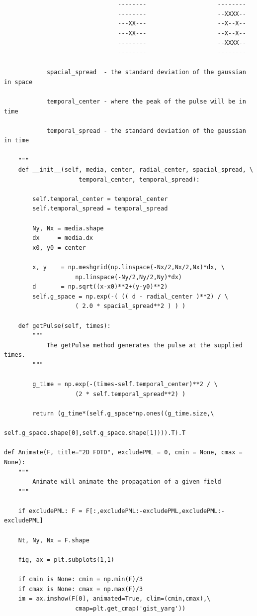 \documentclass[12pt]{article}
\begin{document}
\begin{verbatim}
                                --------                    --------
                                --------                    --XXXX--
                                ---XX---                    --X--X--
                                ---XX---                    --X--X--
                                --------                    --XXXX--
                                --------                    --------

            spacial_spread  - the standard deviation of the gaussian in space

            temporal_center - where the peak of the pulse will be in time

            temporal_spread - the standard deviation of the gaussian in time

    """
    def __init__(self, media, center, radial_center, spacial_spread, \
                     temporal_center, temporal_spread):

        self.temporal_center = temporal_center
        self.temporal_spread = temporal_spread

        Ny, Nx = media.shape
        dx     = media.dx
        x0, y0 = center

        x, y    = np.meshgrid(np.linspace(-Nx/2,Nx/2,Nx)*dx, \
                    np.linspace(-Ny/2,Ny/2,Ny)*dx)
        d       = np.sqrt((x-x0)**2+(y-y0)**2)
        self.g_space = np.exp(-( (( d - radial_center )**2) / \
                    ( 2.0 * spacial_spread**2 ) ) )

    def getPulse(self, times):
        """
            The getPulse method generates the pulse at the supplied times.
        """

        g_time = np.exp(-(times-self.temporal_center)**2 / \
                    (2 * self.temporal_spread**2) )

        return (g_time*(self.g_space*np.ones((g_time.size,\
                    self.g_space.shape[0],self.g_space.shape[1]))).T).T

def Animate(F, title="2D FDTD", excludePML = 0, cmin = None, cmax = None):
    """
        Animate will animate the propagation of a given field
    """

    if excludePML: F = F[:,excludePML:-excludePML,excludePML:-excludePML]

    Nt, Ny, Nx = F.shape

    fig, ax = plt.subplots(1,1)

    if cmin is None: cmin = np.min(F)/3
    if cmax is None: cmax = np.max(F)/3
    im = ax.imshow(F[0], animated=True, clim=(cmin,cmax),\
                    cmap=plt.get_cmap('gist_yarg'))


\end{verbatim}
\end{document}
